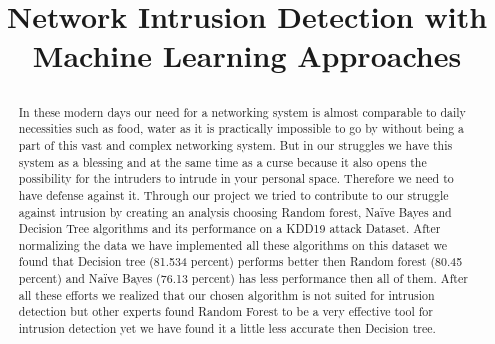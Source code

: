 \documentclass[conference]{IEEEtran}
\begin{document}
\title{Network Intrusion Detection with Machine Learning                  Approaches  \\
{\footnotesize \textsuperscript{}}

}

\author{
\and
{}
\and
{}
\and
{}

}

\maketitle

\begin{abstract}
In these modern days our need for a networking system is almost comparable to daily necessities such as food, water as it is practically impossible to go by without being a part of this vast and complex networking system. But in our struggles we have this system as a blessing and at the same time as a curse because it also opens the possibility for the intruders to intrude in your personal space. Therefore we need to have defense against it. Through our project we tried to contribute to our struggle against intrusion by creating an analysis choosing Random forest, Naïve Bayes and Decision Tree algorithms and its performance on a KDD19 attack Dataset. After normalizing the data we have implemented all these algorithms on this dataset we found that Decision tree (81.534 percent) performs better then Random forest (80.45 percent) and Naïve Bayes (76.13 percent) has less performance then all of them. After all these efforts we realized that our chosen algorithm is not suited for intrusion detection but other experts found Random Forest to be a very effective tool for intrusion detection yet we have found it a little less accurate then Decision tree.    

\end{abstract}
\end{document}
